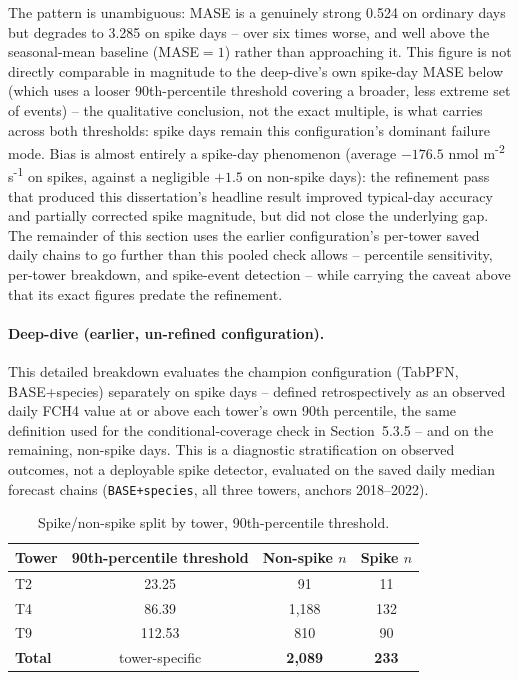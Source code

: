 The pattern is unambiguous: MASE is a genuinely strong 0.524 on ordinary days but degrades to 3.285
on spike days -- over six times worse, and well above the seasonal-mean baseline (MASE$=1$) rather
than approaching it. This figure is not directly comparable in magnitude to the deep-dive's own
spike-day MASE below (which uses a looser 90th-percentile threshold covering a broader, less extreme
set of events) -- the qualitative conclusion, not the exact multiple, is what carries across both
thresholds: spike days remain this configuration's dominant failure mode. Bias is almost entirely a
spike-day phenomenon (average $-176.5$ nmol m\textsuperscript{-2} s\textsuperscript{-1} on spikes,
against a negligible $+1.5$ on non-spike days): the refinement pass that produced this dissertation's
headline result improved typical-day accuracy and partially corrected spike magnitude, but did not
close the underlying gap. The
remainder of this section uses the earlier configuration's per-tower saved daily chains to go
further than this pooled check allows -- percentile sensitivity, per-tower breakdown, and
spike-event detection -- while carrying the caveat above that its exact figures predate the
refinement.

\paragraph{Deep-dive (earlier, un-refined configuration).} This detailed breakdown
evaluates the champion configuration (TabPFN, BASE+species) separately on spike days -- defined
retrospectively as an observed daily FCH4 value at or above each tower's own 90th percentile, the
same definition used for the conditional-coverage check in Section~5.3.5 -- and on the remaining,
non-spike days. This is a diagnostic stratification on observed outcomes, not a deployable spike
detector, evaluated on the saved daily median forecast chains (\texttt{BASE+species}, all three
towers, anchors 2018--2022).

\begin{table}[htbp]
\centering
\begin{tabular}{lccc}
\toprule
Tower & 90th-percentile threshold & Non-spike $n$ & Spike $n$ \\
\midrule
T2 & 23.25 & 91 & 11 \\
T4 & 86.39 & 1{,}188 & 132 \\
T9 & 112.53 & 810 & 90 \\
\midrule
\textbf{Total} & tower-specific & \textbf{2{,}089} & \textbf{233} \\
\bottomrule
\end{tabular}
\caption{Spike/non-spike split by tower, 90th-percentile threshold.}
\end{table}

